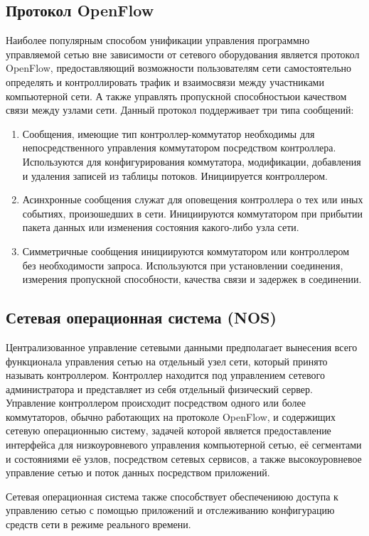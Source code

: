 \documentclass[bachelor, och, coursework]{SCWorks}
\begin{document}
\subsection{Протокол OpenFlow}\label{OpenFlow}
Наиболее популярным способом унификации управления программно управляемой сетью вне зависимости от сетевого оборудования является протокол OpenFlow\cite{openflow}, предоставляющий возможности пользователям сети самостоятельно определять и контроллировать трафик и взаимосвязи между участниками компьютерной сети. А также управлять пропускной способностьюи качеством связи между узлами сети. Данный протокол поддерживает три типа сообщений:
\begin{enumerate}
    \item Сообщения, имеющие тип контроллер-коммутатор необходимы для непосредственного управления коммутатором посредством контроллера. Используются для конфигурирования коммутатора, модификации, добавления и удаления записей из таблицы потоков. Инициируется контроллером.
    \item Асинхронные сообщения служат для оповещения контроллера о тех или иных событиях, произошедших в сети. Инициируются коммутатором при прибытии пакета данных или изменения состояния какого-либо узла сети.
    \item Симметричные сообщения инициируются коммутатором или контроллером без необходимости запроса. Используются при установлении соединения, измерения пропускной способности, качества связи и задержек в соединении.
\end{enumerate}

\subsection{Сетевая операционная система (NOS)}\label{nos}
Централизованное управление сетевыми данными предполагает вынесения всего функционала управления сетью  на отдельный узел сети, который принято называть контроллером. Контроллер находится под управлением сетевого администратора и представляет из себя отдельный физический сервер.
Управление контроллером происходит посредством одного или более коммутаторов, обычно работающих на протоколе OpenFlow, и содержищих сетевую операционныю систему, задачей которой является предоставление интерфейса для низкоуровневого управления компьютерной сетью, её сегментами и состояниями её узлов, посредством сетевых сервисов, а также высокоуровневое управление сетью и поток данных посредством приложений\cite{tadviser}.

Сетевая операционная система также способствует обеспечениюю доступа к управлению сетью с помощью приложений и отслеживанию конфигурацию средств сети в режиме реального времени.
\end{document}
